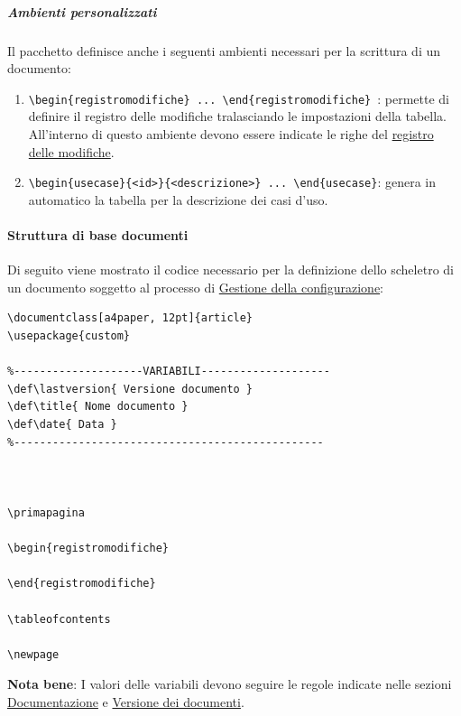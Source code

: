 \subparagraph{Ambienti personalizzati}
\label{subpar:ambienti_personalizzati}
Il pacchetto definisce anche i seguenti ambienti necessari per la scrittura di un documento:
\begin{enumerate}
    \item \lstinline|\begin{registromodifiche} ... \end{registromodifiche}|\ :
    permette di definire il registro delle modifiche tralasciando le impostazioni della tabella.
    All'interno di questo ambiente devono essere indicate le righe del \hyperref[par:registro_delle_modifiche]{registro delle modifiche}.
    \item \lstinline|\begin{usecase}{<id>}{<descrizione>} ... \end{usecase}|:
    genera in automatico la tabella per la descrizione dei casi d'uso.    
\end{enumerate}

\paragraph{Struttura di base documenti}
\label{par:struttura_di_base_documenti}
Di seguito viene mostrato il codice necessario per la definizione dello scheletro di un documento soggetto al processo di \hyperref[subsec:gestione_della_configurazione]{Gestione della configurazione}:

\begin{lstlisting}
\documentclass[a4paper, 12pt]{article}
\usepackage{custom}

%--------------------VARIABILI--------------------
\def\lastversion{ Versione documento }
\def\title{ Nome documento }
\def\date{ Data }
%------------------------------------------------



\primapagina

\begin{registromodifiche}

\end{registromodifiche}

\tableofcontents

\newpage

\end{lstlisting}
\textbf{Nota bene}: I valori delle variabili devono seguire le regole indicate nelle sezioni \hyperref[subsec:documentazione]{Documentazione} e \hyperref[par:versione_documenti]{Versione dei documenti}.

